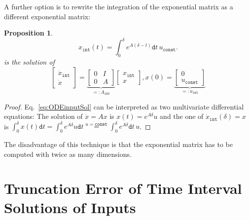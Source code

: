 \documentclass{amsproc}
\newtheorem{proposition}{Proposition}[section]
\renewcommand{\^}[1]{^{(#1)}}
\begin{document}
A further option is to rewrite the integration of the exponential matrix as a different exponential matrix:
\begin{proposition}
 \begin{equation*}
 x_\mathtt{int}(t) = \int_0^\delta e^{A (\delta - t)} \mathtt{d}t \, u_{\mathtt{const}}.
\end{equation*}
is the solution of
\begin{equation} \label{eq:ODEinputSol}
 \begin{bmatrix} \dot{x}_\mathtt{int} \\ \dot{x} \end{bmatrix} = \underbrace{\begin{bmatrix} 0 & I \\ 0 & A \end{bmatrix}}_{=:A_\mathtt{int}} \begin{bmatrix} x_\mathtt{int} \\ x \end{bmatrix}, x(0) = \underbrace{\begin{bmatrix} 0 \\ u_{\mathtt{const}} \end{bmatrix}}_{=: u_\mathtt{int}}
\end{equation}
\end{proposition}
\begin{proof}
 Eq.~\eqref{eq:ODEinputSol} can be interpreted as two multivariate differential equations: The solution of $\dot{x} = A x$ is $x(t) = e^{A \delta} u$ and the one of $\dot{x}_\mathtt{int}(\delta) = x$ is $\int_0^\delta x(t) \mathtt{d}t = \int_0^\delta e^{A \delta} u \mathtt{d}t \overset{u=\mathtt{const}}{=} \int_0^\delta e^{A \delta} \mathtt{d}t \, u$.
\end{proof}
The disadvantage of this technique is that the exponential matrix has to be computed with twice as many dimensions.


\section{Truncation Error of Time Interval Solutions of Inputs}
\end{document}
